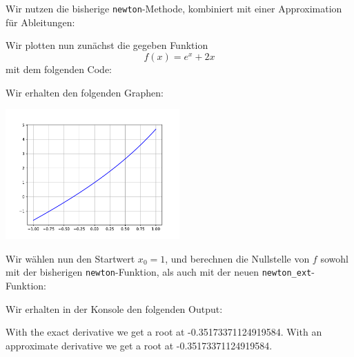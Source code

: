 \section{}

Wir nutzen die bisherige \texttt{newton}-Methode, kombiniert mit einer Approximation für Ableitungen:



Wir plotten nun zunächst die gegeben Funktion
\[
  f(x) = e^x + 2x
\]
mit dem folgenden Code:



Wir erhalten den folgenden Graphen:

\begin{center}
  \includegraphics[width = 0.5\textwidth]{chapter_04/exercise_04_14_figure.pdf}
\end{center}

Wir wählen nun den Startwert $x_0 = 1$, und berechnen die Nullstelle von $f$ sowohl mit der bisherigen \texttt{newton}-Funktion, als auch mit der neuen \texttt{newton\_ext}-Funktion:



Wir erhalten in der Konsole den folgenden Output:

\begin{consoleoutput}
With the exact derivative we get a root at      -0.35173371124919584.
With an approximate derivative we get a root at -0.35173371124919584.
\end{consoleoutput}
